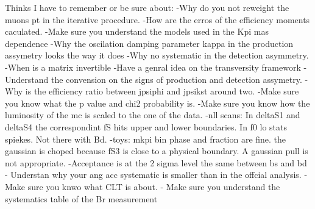 
Thinks I have to remember or be sure about:
-Why do you not reweight the muons pt in the iterative procedure.
-How are the erros of the efficiency moments caculated.
-Make sure you understand the models used in the Kpi mas dependence
-Why the oscilation damping parameter kappa in the production assymetry looks the way it does
-Why no systematic in the detection asymmetry.
-When is a matrix invertible
-Have a genral idea on the transversity framework
-Understand the convension on the signs of production and detection assymetry.
-Why is the efficiency ratio between jpsiphi and jpsikst around two.
-Make sure you know what the p value and chi2 probability is.
-Make sure you know how the luminosity of the mc is scaled to the one of the data.
-nll scans:
    In deltaS1 and deltaS4 the correspondint fS hits upper and lower boundaries.
    In f0 lo stats spiekes. Not there with Bd.
-toys:
    mkpi bin phase and fraction are fine. the gaussian is choped because fS3 is close to a physical boundary. A gaussian pull is not appropriate.
-Acceptance is at the 2 sigma level the same between bs and bd
- Understan why your ang acc systematic is smaller than in the offcial analysis.
- Make sure you knwo what CLT is about.
- Make sure you understand the systematics table of the Br measurement

